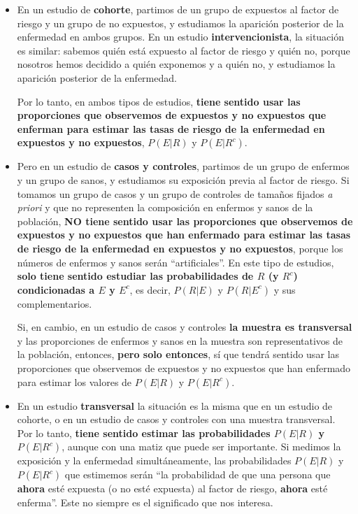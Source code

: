 \documentclass[
]{book}
\theoremstyle{definition}
\theoremstyle{definition}
\theoremstyle{definition}
\theoremstyle{definition}
\theoremstyle{remark}
\begin{document}
\begin{itemize}
\item
  En un estudio de \textbf{cohorte}, partimos de un grupo de expuestos al factor de riesgo y un grupo de no expuestos, y estudiamos la aparición posterior de la enfermedad en ambos grupos. En un estudio \textbf{intervencionista}, la situación es similar: sabemos quién está expuesto al factor de riesgo y quién no, porque nosotros hemos decidido a quién exponemos y a quién no, y estudiamos la aparición posterior de la enfermedad.

  Por lo tanto, en ambos tipos de estudios, \textbf{tiene sentido usar las proporciones que observemos de expuestos y no expuestos que enferman para estimar las tasas de riesgo de la enfermedad en expuestos y no expuestos}, \(P(E|R)\) y \(P(E|R^c)\).
\item
  Pero en un estudio de \textbf{casos y controles}, partimos de un grupo de enfermos y un grupo de sanos, y estudiamos su exposición previa al factor de riesgo. Si tomamos un grupo de casos y un grupo de controles de tamaños fijados \emph{a priori} y que no representen la composición en enfermos y sanos de la población, \textbf{NO tiene sentido usar las proporciones que observemos de expuestos y no expuestos que han enfermado para estimar las tasas de riesgo de la enfermedad en expuestos y no expuestos}, porque los números de enfermos y sanos serán ``artificiales''. En este tipo de estudios, \textbf{solo tiene sentido estudiar las probabilidades de \(R\) (y \(R^c\)) condicionadas a \(E\) y \(E^c\)}, es decir, \(P(R|E)\) y \(P(R|E^c)\) y sus complementarios.

  Si, en cambio, en un estudio de casos y controles \textbf{la muestra es transversal} y las proporciones de enfermos y sanos en la muestra son representativos de la población, entonces, \textbf{pero solo entonces}, sí que tendrá sentido usar las proporciones que observemos de expuestos y no expuestos que han enfermado para estimar los valores de \(P(E|R)\) y \(P(E|R^c)\).
\item
  En un estudio \textbf{transversal} la situación es la misma que en un estudio de cohorte, o en un estudio de casos y controles con una muestra transversal. Por lo tanto, \textbf{tiene sentido estimar las probabilidades \(P(E|R)\) y \(P(E|R^c)\)}, aunque con una matiz que puede ser importante. Si medimos la exposición y la enfermedad simultáneamente, las probabilidades \(P(E|R)\) y \(P(E|R^c)\) que estimemos serán ``la probabilidad de que una persona que \textbf{ahora} esté expuesta (o no esté expuesta) al factor de riesgo, \textbf{ahora} esté enferma''. Este no siempre es el significado que nos interesa.
\end{itemize}
\end{document}
